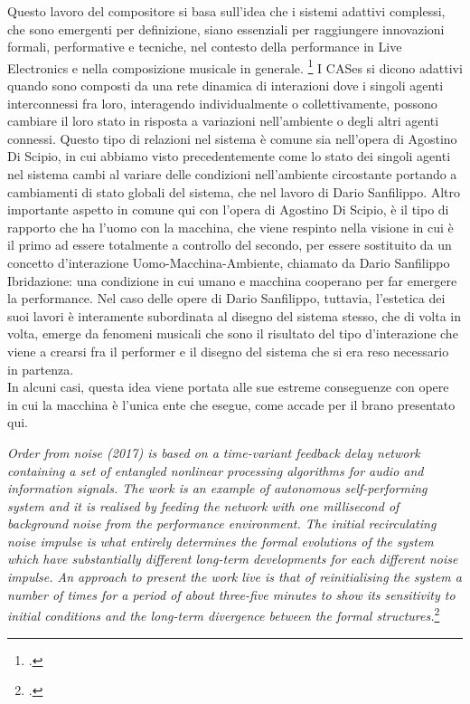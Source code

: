 Questo lavoro del compositore si basa sull'idea che i sistemi adattivi complessi, 
che sono emergenti per definizione, siano essenziali per raggiungere innovazioni formali, 
performative e tecniche, nel contesto della performance in Live Electronics e nella composizione musicale in generale. 
\footcite{sanfilippo_time-variant_2018}
I CASes si dicono adattivi quando sono composti da una rete dinamica 
di interazioni dove i singoli agenti interconnessi fra loro, interagendo individualmente
o collettivamente, possono cambiare il loro stato in risposta a variazioni nell'ambiente o
degli altri agenti connessi. 
Questo tipo di relazioni nel sistema è comune sia nell'opera di Agostino Di Scipio,
in cui abbiamo visto precedentemente come lo stato dei singoli agenti nel sistema 
cambi al variare delle condizioni nell'ambiente circostante portando a
cambiamenti di stato globali del sistema, che nel lavoro di Dario Sanfilippo.
Altro importante aspetto in comune qui con l'opera di Agostino Di Scipio,
è il tipo di rapporto che ha l'uomo con la macchina, che viene respinto nella visione in cui è il primo
ad essere totalmente a controllo del secondo, per essere sostituito da un concetto 
d'interazione Uomo-Macchina-Ambiente, chiamato da Dario Sanfilippo Ibridazione: 
una condizione in cui umano e macchina cooperano per far emergere la performance. 
Nel caso delle opere di Dario Sanfilippo, tuttavia, l'estetica dei suoi lavori è interamente subordinata
al disegno del sistema stesso, che di volta in volta, emerge da fenomeni musicali che sono il risultato
del tipo d'interazione che viene a crearsi fra il performer e il disegno del sistema che si era reso necessario
in partenza. \\
In alcuni casi, questa idea viene portata alle sue estreme conseguenze con opere in cui la macchina è l'unica 
ente che esegue, come accade per il brano presentato qui.

\begin{center}
    \vspace{0.5cm}
    \textit{Order from noise (2017) is based on a time-variant feedback delay network containing a 
    set of entangled nonlinear processing algorithms for audio and information signals. 
    The work is an example of autonomous self-performing system and it is realised by
    feeding the network with one millisecond of background noise from the performance
    environment. The initial recirculating noise impulse is what entirely determines the
    formal evolutions of the system which have substantially different long-term developments 
    for each different noise impulse. An approach to present the work live is that
    of reinitialising the system a number of times for a period of about three-five minutes
    to show its sensitivity to initial conditions and the long-term divergence between the
    formal structures.}\footcite{sanfilippo_time-variant_2018}
    \vspace{0.5cm}
\end{center}

